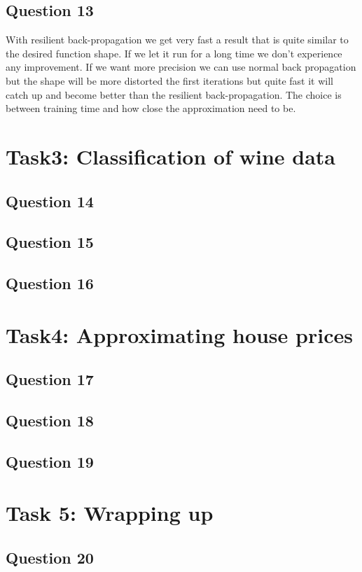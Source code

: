 \documentclass[a4paper]{article}
\begin{document}
\subsection*{Question 13}
With resilient back-propagation we get very fast a result that is quite similar to the desired function shape. If we let it run for a long time we don't experience any improvement. If we want more precision we can use normal back propagation but the shape will be more distorted the first iterations but quite fast it will catch up and become better than the resilient back-propagation. The choice is between training time and how close the approximation need to be. 

\section{Task3: Classification of wine data}
\subsection*{Question 14}
\subsection*{Question 15}
\subsection*{Question 16}

\section{Task4: Approximating house prices}

\subsection*{Question 17}
\subsection*{Question 18}
\subsection*{Question 19}

\section{Task 5: Wrapping up}
\subsection*{Question 20}
\end{document}
